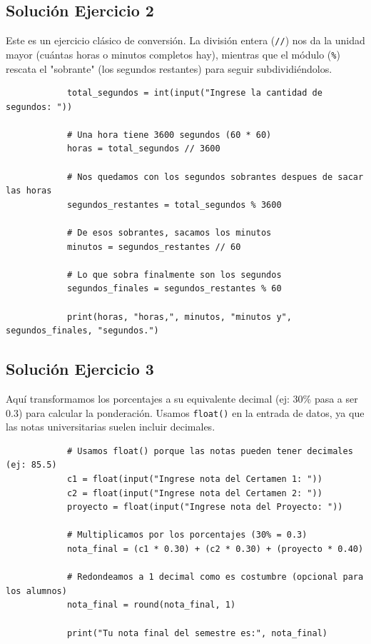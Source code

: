 \documentclass[11pt, a4paper]{article}
\begin{document}
	\subsection*{Solución Ejercicio 2}
	\begin{solucion}
		Este es un ejercicio clásico de conversión. La división entera (\texttt{//}) nos da la unidad mayor (cuántas horas o minutos completos hay), mientras que el módulo (\texttt{\%}) rescata el "sobrante" (los segundos restantes) para seguir subdividiéndolos.
		
		\begin{lstlisting}
			total_segundos = int(input("Ingrese la cantidad de segundos: "))
			
			# Una hora tiene 3600 segundos (60 * 60)
			horas = total_segundos // 3600
			
			# Nos quedamos con los segundos sobrantes despues de sacar las horas
			segundos_restantes = total_segundos % 3600
			
			# De esos sobrantes, sacamos los minutos
			minutos = segundos_restantes // 60
			
			# Lo que sobra finalmente son los segundos
			segundos_finales = segundos_restantes % 60
			
			print(horas, "horas,", minutos, "minutos y", segundos_finales, "segundos.")
		\end{lstlisting}
	\end{solucion}
	
	\subsection*{Solución Ejercicio 3}
	\begin{solucion}
		Aquí transformamos los porcentajes a su equivalente decimal (ej: 30\% pasa a ser 0.3) para calcular la ponderación. Usamos \texttt{float()} en la entrada de datos, ya que las notas universitarias suelen incluir decimales.
		
		\begin{lstlisting}
			# Usamos float() porque las notas pueden tener decimales (ej: 85.5)
			c1 = float(input("Ingrese nota del Certamen 1: "))
			c2 = float(input("Ingrese nota del Certamen 2: "))
			proyecto = float(input("Ingrese nota del Proyecto: "))
			
			# Multiplicamos por los porcentajes (30% = 0.3)
			nota_final = (c1 * 0.30) + (c2 * 0.30) + (proyecto * 0.40)
			
			# Redondeamos a 1 decimal como es costumbre (opcional para los alumnos)
			nota_final = round(nota_final, 1)
			
			print("Tu nota final del semestre es:", nota_final)
		\end{lstlisting}
	\end{solucion}
	
\end{document}
